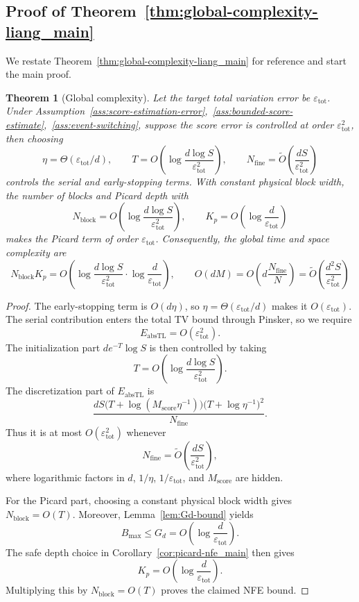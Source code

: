 \documentclass{article}
\newtheorem{theorem}{Theorem}[section]
\begin{document}
\subsection{Proof of Theorem~\ref{thm:global-complexity-liang_main}}
\label{appd:global_comp}
We restate Theorem~\ref{thm:global-complexity-liang_main} for reference and start the main proof.

\begin{theorem}[Global complexity]
\label{thm:global-complexity-liang}
Let the target total variation error be $\varepsilon_{\mathrm{tot}}$.  Under Assumption~\ref{ass:score-estimation-error},~\ref{ass:bounded-score-estimate},~\ref{ass:event-switching}, suppose the score error is controlled at order $\varepsilon_{\mathrm{tot}}^2$, then choosing
\[
\eta=\Theta(\varepsilon_{\mathrm{tot}}/d),
\qquad
T=O\left(\log\frac{d\log S}{\varepsilon_{\mathrm{tot}}^2}\right),
\qquad
N_{\mathrm{fine}}=\widetilde O\left(\frac{dS}{\varepsilon_{\mathrm{tot}}^2}\right)
\]
controls the serial and early-stopping terms.  With constant physical block width, the number of blocks and Picard depth with
\[
N_{\mathrm{block}}
=
O\left(\log\frac{d\log S}{\varepsilon_{\mathrm{tot}}^2}\right),
\qquad
K_p
=
O\left(\log\frac{d}{\varepsilon_{\mathrm{tot}}}\right)
\]
makes the Picard term of order $\varepsilon_{\mathrm{tot}}$.  Consequently, the global time and space complexity are
\[
N_{\mathrm{block}}K_p
=
O\left(
\log\frac{d \log S}{\varepsilon_{\mathrm{tot}}^2}
\cdot
\log\frac{d}{\varepsilon_{\mathrm{tot}}}
\right),
\qquad
O(dM)=
O\left(d\frac{N_{\mathrm{fine}}}{N}\right)
=
\widetilde O\left(\frac{d^2S}{\varepsilon_{\mathrm{tot}}^2}\right)
\]
\end{theorem}
\begin{proof}
The early-stopping term is $O(d\eta)$, so $\eta=\Theta(\varepsilon_{\mathrm{tot}}/d)$ makes it $O(\varepsilon_{\mathrm{tot}})$.  The serial contribution enters the total TV bound through Pinsker, so we require
\[
E_{\mathrm{absTL}}=O(\varepsilon_{\mathrm{tot}}^2).
\]
The initialization part $d e^{-T}\log S$ is then controlled by taking
\[
T=O\left(\log\frac{d\log S}{\varepsilon_{\mathrm{tot}}^2}\right).
\]
The discretization part of $E_{\mathrm{absTL}}$ is
\[
\frac{dS\bigl(T+\log(M_{\mathrm{score}}\eta^{-1})\bigr)
          \bigl(T+\log \eta^{-1}\bigr)^2}{N_{\mathrm{fine}}}.
\]
Thus it is at most $O(\varepsilon_{\mathrm{tot}}^2)$ whenever
\[
N_{\mathrm{fine}}
=
\widetilde O\left(\frac{dS}{\varepsilon_{\mathrm{tot}}^2}\right),
\]
where logarithmic factors in $d$, $1/\eta$, $1/\varepsilon_{\mathrm{tot}}$, and $M_{\mathrm{score}}$ are hidden.

For the Picard part, choosing a constant physical block width gives $N_{\mathrm{block}}=O(T)$.  Moreover, Lemma~\ref{lem:Gd-bound} yields
\[
B_{\max}
\le
G_d
=
O\left(\log\frac d{\varepsilon_{\mathrm{tot}}}\right).
\]
The safe depth choice in Corollary~\ref{cor:picard-nfe_main} then gives
\[
K_p
=
O\left(\log\frac d{\varepsilon_{\mathrm{tot}}}\right).
\]
Multiplying this by $N_{\mathrm{block}}=O(T)$ proves the claimed NFE bound.
\end{proof}
\end{document}
